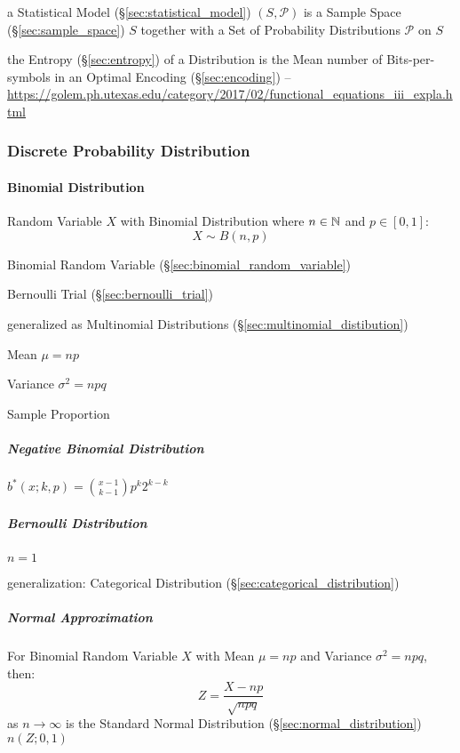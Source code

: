 a Statistical Model (\S\ref{sec:statistical_model}) $(S,\mathcal{P})$ is a
Sample Space (\S\ref{sec:sample_space}) $S$ together with a Set of Probability
Distributions $\mathcal{P}$ on $S$

the Entropy (\S\ref{sec:entropy}) of a Distribution is the Mean number
of Bits-per-symbols in an Optimal Encoding (\S\ref{sec:encoding}) --
\url{https://golem.ph.utexas.edu/category/2017/02/functional_equations_iii_expla.html}



\subsubsection{Discrete Probability Distribution}
\label{sec:discrete_probability}

\paragraph{Binomial Distribution}\label{sec:binomial_distribution}\hfill

Random Variable $X$ with Binomial Distribution where $n \in \mathbb{N}$ and
$p \in [0,1]$:
\[
  X \sim B(n,p)
\]

Binomial Random Variable (\S\ref{sec:binomial_random_variable})

Bernoulli Trial (\S\ref{sec:bernoulli_trial})

generalized as Multinomial Distributions (\S\ref{sec:multinomial_distibution})

Mean $\mu = n p$

Variance $\sigma^2 = n p q$

Sample Proportion %



\subparagraph{Negative Binomial Distribution}\hfill
\label{sec:negative_binomial}

$b^*(x; k,p) = \binom{x-1}{k-1} p^k 2^{k-k}$



\subparagraph{Bernoulli Distribution}\label{sec:bernoulli_distribution}\hfill

$n = 1$

generalization: Categorical Distribution (\S\ref{sec:categorical_distribution})



\subparagraph{Normal Approximation}\label{sec:normal_approximation}\hfill

For Binomial Random Variable $X$ with Mean $\mu = np$ and Variance
$\sigma^2 = npq$, then:
\[
  Z = \frac{X - np}{\sqrt{npq}}
\]
as $n \rightarrow \infty$ is the Standard Normal Distribution
(\S\ref{sec:normal_distribution}) $n(Z;0,1)$



